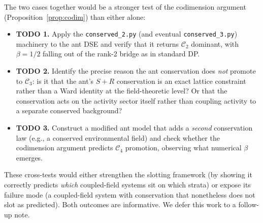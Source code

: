 \documentclass[10pt,a4paper,twocolumn]{article}
\theoremstyle{plain}
\theoremstyle{definition}
\newcommand{\Cstr}[1]{\mathcal{C}_{#1}}
\begin{document}
The two cases together would be a stronger test of the codimension
argument (Proposition~\ref{prop:codim}) than either alone:
\begin{itemize}[leftmargin=1.2em,itemsep=1pt]
  \item \textbf{TODO 1.}  Apply the \texttt{conserved\_2.py} (and
    eventual \texttt{conserved\_3.py}) machinery to the ant DSE
    and verify that it returns $\Cstr{2}$ dominant, with $\beta = 1/2$
    falling out of the rank-2 bridge as in standard DP.
  \item \textbf{TODO 2.}  Identify the precise reason the ant
    conservation does \emph{not} promote to $\Cstr{3}$: is it that
    the ant's $S+R$ conservation is an exact lattice constraint
    rather than a Ward identity at the field-theoretic level?
    Or that the conservation acts on the activity sector itself
    rather than coupling activity to a separate conserved background?
  \item \textbf{TODO 3.}  Construct a modified ant model that adds a
    \emph{second} conservation law (e.g., a conserved environmental
    field) and check whether the codimension argument predicts $\Cstr{4}$
    promotion, observing what numerical $\beta$ emerges.
\end{itemize}

These cross-tests would either strengthen the slotting framework
(by showing it correctly predicts \emph{which} coupled-field systems
sit on which strata) or expose its failure mode (a coupled-field
system with conservation that nonetheless does not slot as
predicted).  Both outcomes are informative.  We defer this work to a
follow-up note.
\end{document}
